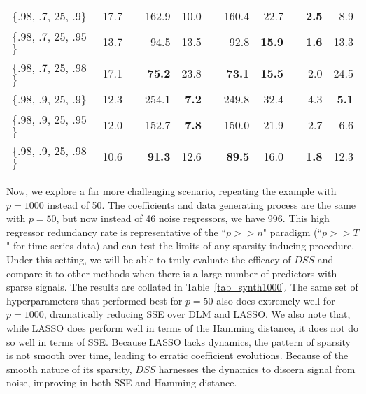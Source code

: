 \documentclass[ba]{imsart}
\numberwithin{equation}{section}
\theoremstyle{plain}
\def\B{\mbox{\boldmath$B$}}
\def\B{\mbox{\boldmath$B$}}
\newcommand{\bm}[1]{\boldsymbol{#1}}
\newcommand{\wh}[1]{\smash{\widehat{#1}}}
\def\B{\bm{B}}
\begin{document}
\begin{table}[!t]
{\begin{tabular}{lrlrrlrrlrr}
\hline
$\{$.98, .7, 25, .9$\}$  & 17.7  &   & 162.9       & 10.0        &   & 160.4      & 22.7        &   & \textbf{ 2.5}       & 8.9         \\
$\{$.98, .7, 25, .95$\}$ & 13.7  &   & 94.5       & 13.5        &   & 92.8      & \textbf{ 15.9}        &   & \textbf{ 1.6}       & 13.3        \\
$\{$.98, .7, 25, .98$\}$ & 17.1  &   & \textbf{ 75.2}       & 23.8        &   & \textbf{ 73.1}      & \textbf{ 15.5}        &   & 2.0       & 24.5        \\
$\{$.98, .9, 25, .9$\}$  & 12.3  &   & 254.1       & \textbf{ 7.2}        &   & 249.8      & 32.4        &   & 4.3       & \textbf{ 5.1}         \\
$\{$.98, .9, 25, .95$\}$ & 12.0  &   & 152.7       & \textbf{ 7.8}         &   & 150.0      & 21.9        &   & 2.7       & 6.6         \\
$\{$.98, .9, 25, .98$\}$ & 10.6  &   &\textbf{  91.3}       & 12.6        &   & \textbf{ 89.5}      & 16.0        &   & \textbf{ 1.8}       & 12.3       \\
\hline\hline
\end{tabular}}
\end{table}



Now, we explore a far more challenging scenario, repeating the example with $p=1000$ instead of 50.
The coefficients and data generating process are the same with $p=50$, but now instead of 46 noise regressors, we have 996.
This high regressor redundancy rate is representative of the ``$p>>n$" paradigm (``$p>>T$" for time series data) and can test the limits of any sparsity inducing procedure.
Under this setting, we will be able to truly evaluate the efficacy of $DSS$ and compare it to other methods when there is a large number of predictors with sparse signals.
The results are collated in Table~\ref{tab_synth1000}.  The same set of hyperparameters that performed best for $p=50$ also does extremely well  for $p=1000$, dramatically reducing SSE over DLM and LASSO.
We also note that, while LASSO does perform well in terms of  the Hamming distance, it does not do so well in terms of SSE.
Because LASSO lacks dynamics, the pattern of sparsity is not smooth over time, leading to erratic coefficient evolutions.
Because of the smooth nature of its sparsity, $DSS$ harnesses the dynamics to discern signal from noise, improving in both SSE and Hamming distance.
\end{document}
